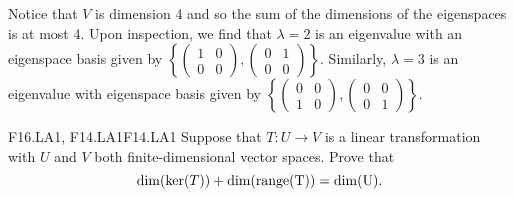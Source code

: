 \documentclass[../AlgebraQualSolutions.tex]{subfiles}
\begin{document}
	\begin{solution}
		Notice that $V$ is dimension 4 and so the sum of the dimensions  of the eigenspaces is at most 4. Upon inspection, we find that $\lambda = 2$ is an eigenvalue with an eigenspace basis given by $\left\{ \begin{pmatrix} 1 & 0 \\ 0 & 0 \end{pmatrix}, \begin{pmatrix} 0 & 1 \\ 0 & 0 \end{pmatrix} \right\}$. Similarly, $\lambda = 3$ is an eigenvalue with eigenspace basis given by $\left\{ \begin{pmatrix} 0 & 0 \\ 1 & 0 \end{pmatrix}, \begin{pmatrix} 0 & 0 \\ 0 & 1 \end{pmatrix} \right\}$. 
	\end{solution}

	\begin{prob}{F16.LA1, F14.LA1}{F14.LA1}
		Suppose that $T: U \to V$ is a linear transformation with $U$ and $V$ both finite-dimensional vector spaces. Prove that
			\[\dim(\ker(T)) + \dim(\rm{range}(T)) = \dim(U).\]
	\end{prob}
\end{document}
